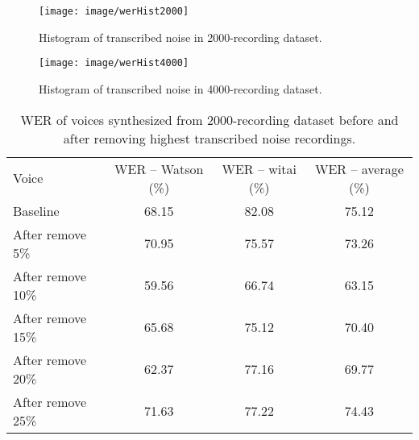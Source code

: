 \documentclass[12pt]{article}
\begin{document}
\begin{figure}[t]
\begin{center}
\texttt{[image: image/werHist2000]}
\end{center}
\vspace{-0.3cm}
\caption[transcribed noise Hist 2000.]{Histogram of transcribed noise in 2000-recording dataset.}
\label{fig_transcribedNoiseHist2000}
\end{figure}

\begin{figure}[t]
\begin{center}
\texttt{[image: image/werHist4000]}
\end{center}
\vspace{-0.3cm}
\caption[transcribed noise Hist 4000.]{Histogram of transcribed noise in 4000-recording dataset.}
\label{fig_transcribedNoiseHist4000}
\end{figure}

\begin{table}[]
\begin{center}
\caption{WER of voices synthesized from 2000-recording dataset before and after removing highest transcribed noise recordings.}
\label{tab_werTranscribedNoise2000}
\vspace{3mm}
\begin{tabular}{lccc}
\hline
Voice & WER – Watson (\%) & WER – witai (\%) & WER – average (\%)\\
\cmidrule(l{0pt}r{2pt}){1-1}\cmidrule(l{0pt}r{2pt}){2-2}\cmidrule(l{0pt}r{2pt}){3-3}\cmidrule(l{0pt}r{2pt}){4-4}
Baseline          & 68.15 & 82.08 & 75.12 \\
After remove 5\%  & 70.95 & 75.57 & 73.26 \\
After remove 10\% & 59.56 & 66.74 & 63.15 \\
After remove 15\% & 65.68 & 75.12 & 70.40 \\
After remove 20\% & 62.37 & 77.16 & 69.77 \\
After remove 25\% & 71.63 & 77.22 & 74.43 \\
\hline
\end{tabular}
\end{center}
\end{table}
\end{document}
